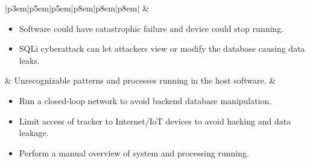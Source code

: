 \documentclass{article}
\begin{document}
\begin{table}[H]
\begin{tabular}{|p{3em}|p{5em}|p{5em}|p{8em}|p{8em}|p{8em}|}
		 & \begin{itemize}[nosep, wide=0pt, leftmargin=*, after=\strut]
			   \item Software could have catastrophic failure and device could stop running.
			   \item SQLi cyberattack can let attackers view or modify the database causing data leaks.
		   \end{itemize}
		 & Unrecognizable patterns and processes running in the host software.
		 & \begin{minipage}[t]{\linewidth}
			   \begin{itemize}[nosep, wide=0pt, leftmargin=*, after=\strut]
			   \item Run a closed-loop network to avoid backend database manipulation.
			   \item Limit access of tracker to Internet/IoT devices to avoid hacking and data leakage.
			   \item Perform a manual overview of system and processing running.
			\end{itemize}
		   \end{minipage}  \tabularnewline{}

	\end{tabular}%
	\end{table}
	
\end{document}
